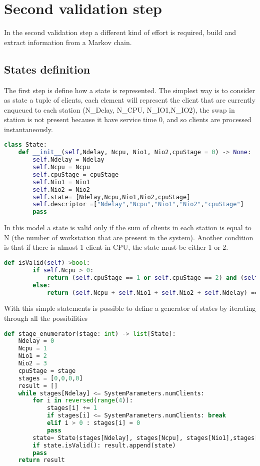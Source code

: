\documentclass[12pt,a4paper]{article}
\begin{document}
\section{Second validation step}
In the second validation step a different kind of effort is required, build and extract information from a Markov chain.
\subsection{States definition}
The first step is define how a state is represented. The simplest way is to consider as state a tuple of clients, each element will represent the client that are currently enqueued to each station (N\_Delay, N\_CPU, N\_IO1,N\_IO2), the swap in station is not present because it have service time 0, and so clients are processed instantaneously. 
\begin{lstlisting}[language=python]
class State:
    def __init__(self,Ndelay, Ncpu, Nio1, Nio2,cpuStage = 0) -> None:
        self.Ndelay = Ndelay
        self.Ncpu = Ncpu
        self.cpuStage = cpuStage
        self.Nio1 = Nio1
        self.Nio2 = Nio2
        self.state= [Ndelay,Ncpu,Nio1,Nio2,cpuStage]
        self.descriptor =["Ndelay","Ncpu","Nio1","Nio2","cpuStage"]
        pass
\end{lstlisting}

In this model a state is valid only if the sum of clients in each station is equal to N (the number of workstation that are present in the system). Another condition is that if there is almost 1 client in CPU, the state must be either 1 or 2.

\begin{lstlisting}[language=python,breaklines]
    def isValid(self)->bool:
        if self.Ncpu > 0:
            return (self.cpuStage == 1 or self.cpuStage == 2) and (self.Ncpu + self.Nio1 + self.Nio2 + self.Ndelay) == SystemParameters.numClients
        else:
            return (self.Ncpu + self.Nio1 + self.Nio2 + self.Ndelay) == SystemParameters.numClients
\end{lstlisting}
\pagebreak
With this simple statements is possible to define a generator of states by iterating through all the possibilities 

\begin{lstlisting}[language=python,breaklines]
def stage_enumerator(stage: int) -> list[State]:
    Ndelay = 0
    Ncpu = 1
    Nio1 = 2
    Nio2 = 3
    cpuStage = stage
    stages = [0,0,0,0]
    result = []
    while stages[Ndelay] <= SystemParameters.numClients:
        for i in reversed(range(4)):
            stages[i] += 1
            if stages[i] <= SystemParameters.numClients: break
            elif i > 0 : stages[i] = 0
            pass
        state= State(stages[Ndelay], stages[Ncpu], stages[Nio1],stages[Nio2],stage)
        if state.isValid(): result.append(state)
        pass
    return result
\end{lstlisting}
\end{document}
